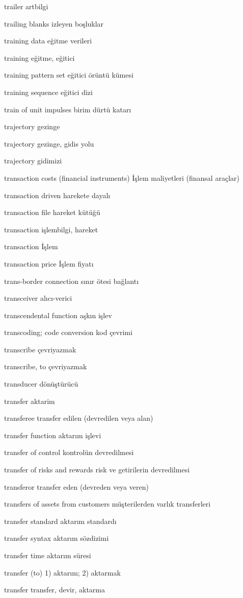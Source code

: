 \documentclass[12pt,fleqn]{article}\usepackage{../../common}
\begin{document}
trailer artbilgi

trailing blanks izleyen boşluklar

training data eğitme verileri

training eğitme, eğitici

training pattern set eğitici örüntü kümesi

training sequence eğitici dizi

train of unit impulses birim dürtü katarı

trajectory gezinge

trajectory gezinge, gidis yolu

trajectory gidimizi

transaction costs (financial instruments) İşlem maliyetleri (finansal araçlar)

transaction driven harekete dayalı

transaction file hareket kütüğü

transaction işlembilgi, hareket

transaction İşlem

transaction price İşlem fiyatı

trans-border connection sınır ötesi bağlantı

transceiver alıcı-verici

transcendental function aşkın işlev

transcoding; code conversion kod çevrimi

transcribe çevriyazmak

transcribe, to çevriyazmak

transducer dönüştürücü

transfer aktarim

transferee transfer edilen (devredilen veya alan)

transfer function aktarım işlevi

transfer of control kontrolün devredilmesi

transfer of risks and rewards risk ve getirilerin devredilmesi

transferor transfer eden (devreden veya veren)

transfers of assets from customers müşterilerden varlık transferleri

transfer standard aktarım standardı

transfer syntax aktarım sözdizimi

transfer time aktarım süresi

transfer (to) 1) aktarım; 2) aktarmak

transfer transfer, devir, aktarma
\end{document}
